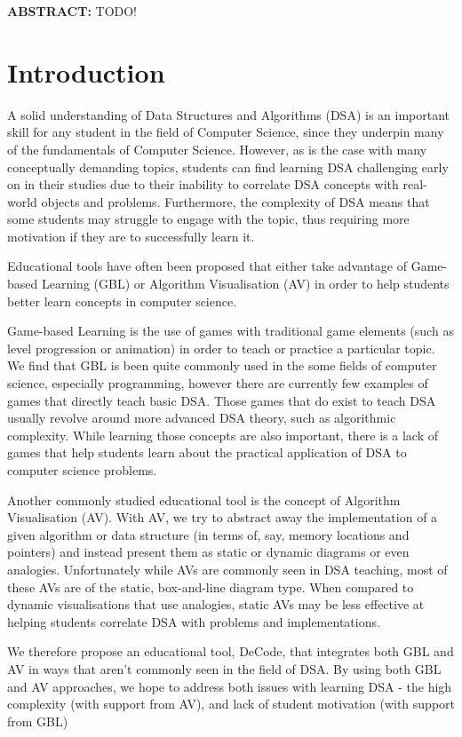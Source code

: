 \documentclass[10pt]{article}
\begin{document}
\noindent \textbf{ABSTRACT:} TODO!

\section{Introduction}
A solid understanding of Data Structures and Algorithms (DSA) is an important skill for any student in the field of Computer Science, since they underpin many of the fundamentals of Computer Science. However, as is the case with many conceptually demanding topics, students can find learning DSA challenging early on in their studies\cite{7600449} due to their inability to correlate DSA concepts with real-world objects and problems. Furthermore, the complexity of DSA means that some students may struggle to engage with the topic, thus requiring more motivation if they are to successfully learn it.\par
Educational tools have often been proposed that either take advantage of Game-based Learning (GBL) or Algorithm Visualisation (AV) in order to help students better learn concepts in computer science.\par
Game-based Learning is the use of games with traditional game elements (such as level progression or animation) in order to teach or practice a particular topic\cite{GBLTeaching}. We find that GBL is been quite commonly used in the some fields of computer science, especially programming, however there are currently few examples of games that directly teach basic DSA. Those games that do exist to teach DSA usually revolve around more advanced DSA theory, such as algorithmic complexity. While learning those concepts are also important, there is a lack of games that help students learn about the practical application of DSA to computer science problems.\par
Another commonly studied educational tool is the concept of Algorithm Visualisation (AV). With AV, we try to abstract away the implementation of a given algorithm or data structure (in terms of, say, memory locations and pointers) and instead present them as static or dynamic diagrams or even analogies. Unfortunately while AVs are commonly seen in DSA teaching, most of these AVs are of the static, box-and-line diagram type\cite{Esponda-Arguero:2010:TVD:1827707.1827710}. When compared to dynamic visualisations that use analogies, static AVs may be less effective at helping students correlate DSA with problems and implementations.\par
We therefore propose an educational tool, DeCode, that integrates both GBL and AV in ways that aren't commonly seen in the field of DSA. By using both GBL and AV approaches, we hope to address both issues with learning DSA - the high complexity (with support from AV), and lack of student motivation (with support from GBL)\par
\end{document}
